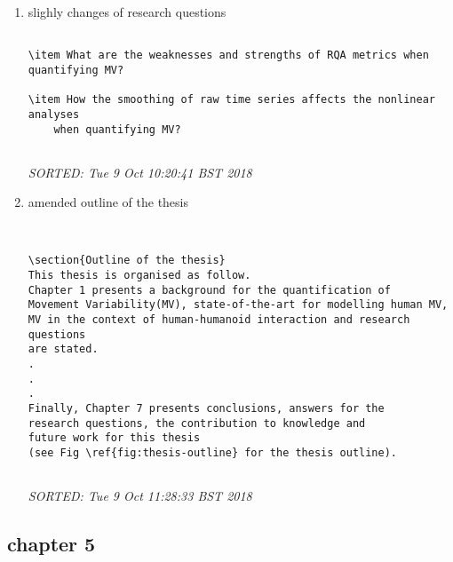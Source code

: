 \documentclass[10pt]{article}
\begin{document}
\begin{enumerate}

\item slighly changes of research questions

\begin{verbatim}

\item What are the weaknesses and strengths of RQA metrics when quantifying MV?

\item How the smoothing of raw time series affects the nonlinear analyses
	when quantifying MV?
 
\end{verbatim}
\textit{
SORTED: 
Tue  9 Oct 10:20:41 BST 2018
}
\\




\item amended outline of the thesis

\begin{verbatim}


\section{Outline of the thesis}
This thesis is organised as follow. 
Chapter 1 presents a background for the quantification of 
Movement Variability(MV), state-of-the-art for modelling human MV,
MV in the context of human-humanoid interaction and research questions
are stated.
.
.
.
Finally, Chapter 7 presents conclusions, answers for the
research questions, the contribution to knowledge and 
future work for this thesis
(see Fig \ref{fig:thesis-outline} for the thesis outline).


\end{verbatim}
\textit{
SORTED:
Tue  9 Oct 11:28:33 BST 2018
}
\\



\end{enumerate}







\subsection{chapter 5}
\end{document}
